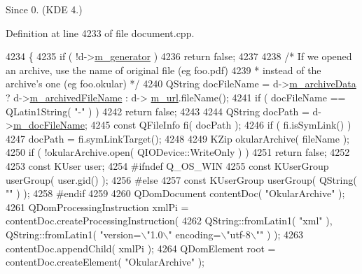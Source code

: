 \begin{DoxySince}{Since}
0. (K\+D\+E 4.) 
\end{DoxySince}


Definition at line 4233 of file document.\+cpp.


\begin{DoxyCode}
4234 \{
4235     \textcolor{keywordflow}{if} ( !d->\hyperlink{classOkular_1_1DocumentPrivate_a52083f79ce95756ddea060e74315e91f}{m\_generator} )
4236         \textcolor{keywordflow}{return} \textcolor{keyword}{false};
4237 
4238     \textcolor{comment}{/* If we opened an archive, use the name of original file (eg foo.pdf)}
4239 \textcolor{comment}{     * instead of the archive's one (eg foo.okular) */}
4240     QString docFileName = d->\hyperlink{classOkular_1_1DocumentPrivate_a135bb6fa2886b0eb86e9a1b72fd8d25b}{m\_archiveData} ? d->\hyperlink{classOkular_1_1DocumentPrivate_ac47be11934cb0cb3e7d8876e3e4653af}{m\_archivedFileName} : d->
      \hyperlink{classOkular_1_1DocumentPrivate_a1a0145bbb16d15c016000a83d0d2ab2b}{m\_url}.fileName();
4241     \textcolor{keywordflow}{if} ( docFileName == QLatin1String( \textcolor{stringliteral}{"-"} ) )
4242         \textcolor{keywordflow}{return} \textcolor{keyword}{false};
4243 
4244     QString docPath = d->\hyperlink{classOkular_1_1DocumentPrivate_af56dcee87c3465c69da7cea920b95fbb}{m\_docFileName};
4245     \textcolor{keyword}{const} QFileInfo fi( docPath );
4246     \textcolor{keywordflow}{if} ( fi.isSymLink() )
4247         docPath = fi.symLinkTarget();
4248 
4249     KZip okularArchive( fileName );
4250     \textcolor{keywordflow}{if} ( !okularArchive.open( QIODevice::WriteOnly ) )
4251         \textcolor{keywordflow}{return} \textcolor{keyword}{false};
4252 
4253     \textcolor{keyword}{const} KUser user;
4254 \textcolor{preprocessor}{#ifndef Q\_OS\_WIN}
4255     \textcolor{keyword}{const} KUserGroup userGroup( user.gid() );
4256 \textcolor{preprocessor}{#else}
4257     \textcolor{keyword}{const} KUserGroup userGroup( QString( \textcolor{stringliteral}{""} ) );
4258 \textcolor{preprocessor}{#endif}
4259 
4260     QDomDocument contentDoc( \textcolor{stringliteral}{"OkularArchive"} );
4261     QDomProcessingInstruction xmlPi = contentDoc.createProcessingInstruction(
4262             QString::fromLatin1( \textcolor{stringliteral}{"xml"} ), QString::fromLatin1( \textcolor{stringliteral}{"version=\(\backslash\)"1.0\(\backslash\)" encoding=\(\backslash\)"utf-8\(\backslash\)""} ) );
4263     contentDoc.appendChild( xmlPi );
4264     QDomElement root = contentDoc.createElement( \textcolor{stringliteral}{"OkularArchive"} );

\end{DoxyCode}
